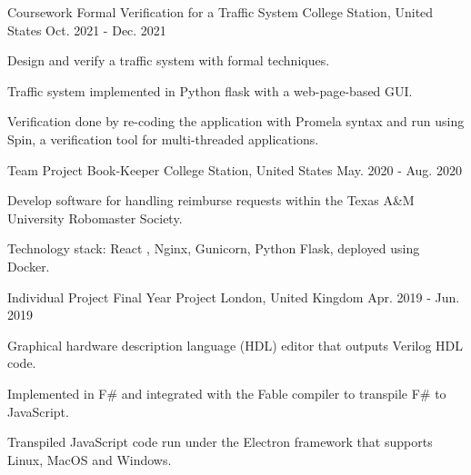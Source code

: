 
\begin{cventries}

    \cventry
    {Coursework}
    {Formal Verification for a Traffic System}
    {College Station, United States}
    {Oct. 2021 - Dec. 2021}
    {
        \begin{cvitems}
            \item Design and verify a traffic system with formal techniques.
            \item Traffic system implemented in Python flask with a web-page-based GUI.
            \item Verification done by re-coding the application with Promela syntax and run using Spin, a verification tool for multi-threaded applications.
        \end{cvitems}
    }
    
    \cventry
    {Team Project}
    {Book-Keeper}
    {College Station, United States}
    {May. 2020 - Aug. 2020}
    {
        \begin{cvitems}
            \item Develop software for handling reimburse requests within the Texas A\&M University Robomaster Society.
            \item Technology stack: React , Nginx, Gunicorn, Python Flask, deployed using Docker.
        \end{cvitems}
    }
    
    \cventry
    {Individual Project} %
    {Final Year Project} %
    {London, United Kingdom} %
    {Apr. 2019 - Jun. 2019} %
    {
      \begin{cvitems} %
        \item {Graphical hardware description language (HDL) editor that outputs Verilog HDL code.}
        \item {Implemented in F\# and integrated with the Fable compiler to transpile F\# to JavaScript.}
        \item {Transpiled JavaScript code run under the Electron framework that supports Linux, MacOS and Windows.}
      \end{cvitems}
    }
    

\end{cventries}
